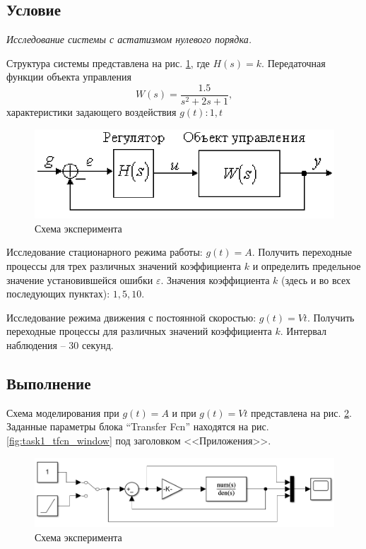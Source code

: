 \documentclass[a4paper, 12pt]{article}
\begin{document}
    \subsection{Условие}
    \textit{Исследование системы с астатизмом нулевого порядка.}
    \begin{compactitem}
        \item Структура системы представлена на рис. \ref{fig:struct_scheme1}, где $H(s)=k$. Передаточная функции объекта
        управления $$W(s)=\dfrac{1.5}{s^2+2s+1},$$ характеристики задающего воздействия $g(t):1,t$
        \begin{figure}[H]
            \centering
            \includegraphics[scale=0.7]{struct_scheme1.png}
            \captionsetup{skip=0pt}
            \caption{Схема эксперимента}
            \label{fig:struct_scheme1}
        \end{figure}
        \item Исследование стационарного режима работы: $g(t)=A$.
        Получить переходные процессы для трех различных значений
        коэффициента $k$ и определить предельное
        значение установившейся ошибки $\varepsilon$.
        Значения коэффициента $k$ (здесь и во
        всех последующих пунктах): $1, 5, 10$.
        \item Исследование режима движения
        с постоянной скоростью: $g(t)=Vt$.
        Получить переходные процессы для различных
        значений коэффициента $k$. Интервал наблюдения --
        $30$ секунд.
    \end{compactitem}
     

    \subsection{Выполнение}
    Схема моделирования при $g(t)=A$ и при $g(t)=Vt$ представлена на рис. \ref{fig:scheme1}.
    Заданные параметры блока ``Transfer Fcn'' находятся на рис. \ref{fig:task1_tfcn_window}
    под заголовком <<Приложения>>.
    \begin{figure}[H]
        \centering
        \includegraphics[scale=0.6]{scheme1.png}
        \captionsetup{skip=0pt}
        \caption{Схема эксперимента}
        \label{fig:scheme1}
    \end{figure}
\end{document}

